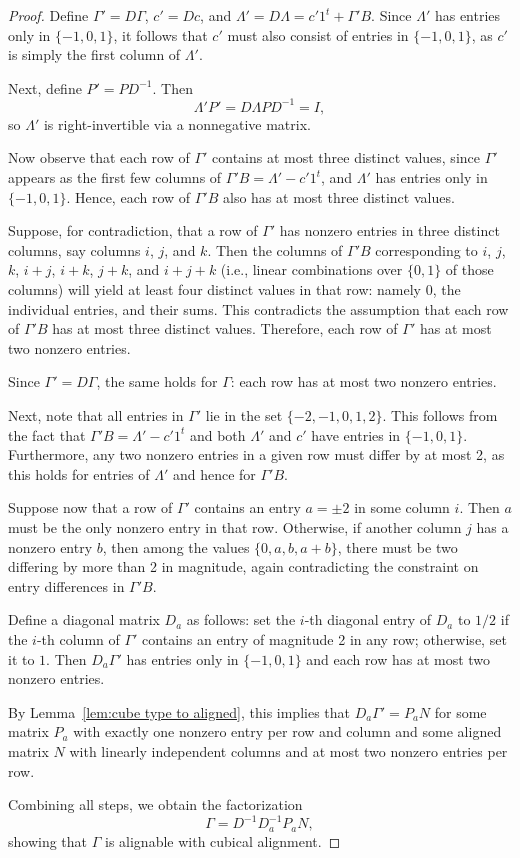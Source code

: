 \documentclass{article}
\begin{document}
\begin{proof}
    Define $\Gamma' = D\Gamma$, $c' = Dc$, and $\Lambda' = D\Lambda = c'1^t + \Gamma'B$. Since $\Lambda'$ has entries only in $\{-1, 0, 1\}$, it follows that $c'$ must also consist of entries in $\{-1, 0, 1\}$, as $c'$ is simply the first column of $\Lambda'$.

    Next, define $P' = P D^{-1}$. Then
    \[
        \Lambda' P' = D\Lambda P D^{-1} = I,
    \]
    so $\Lambda'$ is right-invertible via a nonnegative matrix.

    Now observe that each row of $\Gamma'$ contains at most three distinct values, since $\Gamma'$ appears as the first few columns of $\Gamma'B = \Lambda' - c'1^t$, and $\Lambda'$ has entries only in $\{-1, 0, 1\}$. Hence, each row of $\Gamma'B$ also has at most three distinct values.

    Suppose, for contradiction, that a row of $\Gamma'$ has nonzero entries in three distinct columns, say columns $i$, $j$, and $k$. Then the columns of $\Gamma'B$ corresponding to $i$, $j$, $k$, $i+j$, $i+k$, $j+k$, and $i+j+k$ (i.e., linear combinations over $\{0,1\}$ of those columns) will yield at least four distinct values in that row: namely $0$, the individual entries, and their sums. This contradicts the assumption that each row of $\Gamma'B$ has at most three distinct values. Therefore, each row of $\Gamma'$ has at most two nonzero entries.

    Since $\Gamma' = D\Gamma$, the same holds for $\Gamma$: each row has at most two nonzero entries.

    Next, note that all entries in $\Gamma'$ lie in the set $\{-2, -1, 0, 1, 2\}$. This follows from the fact that $\Gamma'B = \Lambda' - c'1^t$ and both $\Lambda'$ and $c'$ have entries in $\{-1, 0, 1\}$. Furthermore, any two nonzero entries in a given row must differ by at most 2, as this holds for entries of $\Lambda'$ and hence for $\Gamma'B$.

    Suppose now that a row of $\Gamma'$ contains an entry $a = \pm 2$ in some column $i$. Then $a$ must be the only nonzero entry in that row. Otherwise, if another column $j$ has a nonzero entry $b$, then among the values $\{0, a, b, a + b\}$, there must be two differing by more than 2 in magnitude, again contradicting the constraint on entry differences in $\Gamma'B$.

    Define a diagonal matrix $D_a$ as follows: set the $i$-th diagonal entry of $D_a$ to $1/2$ if the $i$-th column of $\Gamma'$ contains an entry of magnitude 2 in any row; otherwise, set it to $1$. Then $D_a \Gamma'$ has entries only in $\{-1, 0, 1\}$ and each row has at most two nonzero entries.

    By Lemma~\ref{lem:cube type to aligned}, this implies that $D_a \Gamma' = P_a N$ for some matrix $P_a$ with exactly one nonzero entry per row and column and some aligned matrix $N$ with linearly independent columns and at most two nonzero entries per row.

    Combining all steps, we obtain the factorization
    \[
        \Gamma = D^{-1} D_a^{-1} P_a N,
    \]
    showing that $\Gamma$ is alignable with cubical alignment.
\end{proof}
\end{document}

